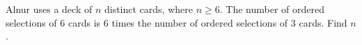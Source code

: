 Alnur uses a deck of $n$ distinct cards, where $n\geqslant6$. The number of ordered selections of $6$ cards is $6$ times the number of ordered selections of $3$ cards. Find $n$.
